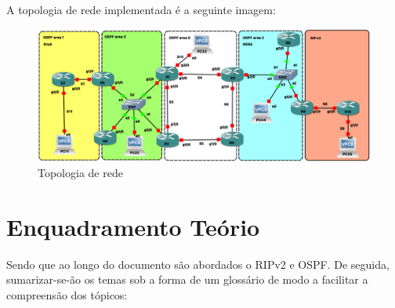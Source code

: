 \documentclass[11pt,english, openright, oneside]{book}
\begin{document}
A topologia de rede implementada é a seguinte imagem:

\begin{figure}[H]
    \centering
    \includegraphics[width=1\textwidth]{imagens/topologia.png}
    \caption{Topologia de rede}
    \label{fig:topologia}
\end{figure}

\chapter{Enquadramento Teório}
Sendo que ao longo do documento são abordados o RIPv2 e OSPF. De seguida, sumarizar-se-ão os temas 
sob a forma de um glossário de modo a facilitar a compreensão dos tópicos:
\end{document}
